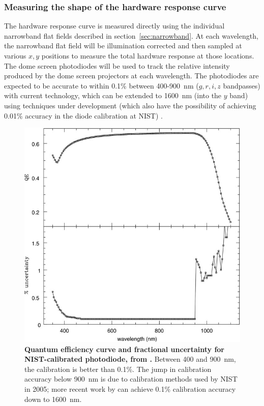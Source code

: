 \documentclass[12pt,preprint]{aastex}
\begin{document}
\subsubsection{Measuring the shape of the hardware response curve}
\label{sec:phi_hardware}

The hardware response curve is measured directly using the individual
narrowband flat fields described in section~\ref{sec:narrowband}. At
each wavelength, the narrowband flat field will be illumination
corrected and then sampled at various $x,y$ positions to measure the
total hardware response at those locations. The dome screen
photodiodes will be used to track the relative intensity produced by
the dome screen projectors at each wavelength. The photodiodes are
expected to be accurate to within 0.1\% between 400-900~nm ($g,r,i,z$
bandpasses) with current technology, which can be extended to 1600~nm
(into the $y$ band) using techniques under development (which also have the
possibility of achieving 0.01\% accuracy in the diode calibration at
NIST) \citep{Eppeldauer09}.

\begin{figure}
\begin{center}
\includegraphics[width=6in]{NIST_diode}
\end{center}
\caption{{\small
{\bf Quantum efficiency curve and fractional uncertainty for NIST-calibrated
photodiode, from \citet{Stubbs2010}.} Between 400 and 900~nm, the 
calibration is better than 0.1\%. The jump in calibration accuracy below
900~nm is due to calibration methods used by NIST in 2005; more recent 
work by \citet{Eppeldauer09} can achieve 0.1\% calibration accuracy
down to 1600~nm.}
}
\label{fig:NIST_diode}
\end{figure}
\end{document}
